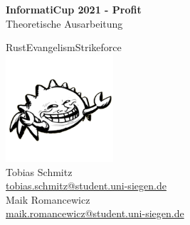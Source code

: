 \documentclass[12pt,a4paper]{article}
\newcommand{\HRule}{\rule{\linewidth}{0.5mm}}
\begin{document}
\begin{titlepage}
\begin{center}


\vspace*{2cm}
{ \LARGE 
  \textbf{InformatiCup 2021 - Profit}\\[0.4cm]
  Theoretische Ausarbeitung\\
}
\vspace*{2cm}

{ \large
  RustEvangelismStrikeforce\\
    \vspace*{1cm}
    \includegraphics[width=0.3\textwidth]{logo.png}\\
  Tobias Schmitz \\ \href{tobias.schmitz@student.uni-siegen.de}{tobias.schmitz@student.uni-siegen.de} \\
  Maik Romancewicz \\ \href{maik.romancewicz@student.uni-siegen.de}{maik.romancewicz@student.uni-siegen.de} \\
}
\vfill



 
\end{center}
\end{titlepage}

\newpage

\tableofcontents
\thispagestyle{empty}
\newpage

\thispagestyle{empty}
\newpage

\setcounter{page}{1}
\end{document}
